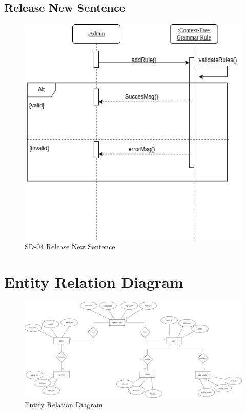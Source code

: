 \documentclass[12pt,a4paper]{article}
\begin{document}
\subsection{Release New Sentence}
\begin{figure}[h]
 \centering
\includegraphics[scale=0.80]{Diagram/New_relesRule.png}
\caption{SD-04 Release New Sentence}
\end{figure}




\newpage
\section{Entity Relation Diagram}

\begin{figure}[hb]
 \centering
\includegraphics[scale=0.33]{Diagram/ER_Diagram.png}
\caption{Entity Relation Diagram}
\end{figure}
\end{document}
